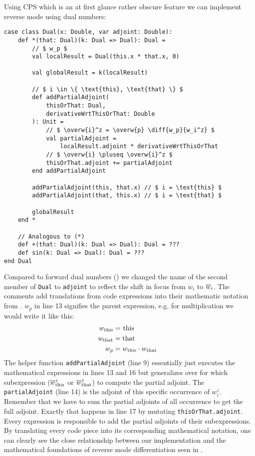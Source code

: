 Using CPS which is an at first glance rather obscure feature we can implement reverse mode using dual numbers:
\begin{lstlisting}[mathescape=true, caption={Reverse mode CPS}, label={lst:cpsDual}]
case class Dual(x: Double, var adjoint: Double):
    def *(that: Dual)(k: Dual => Dual): Dual =
        // $ w_p $
        val localResult = Dual(this.x * that.x, 0)

        val globalResult = k(localResult)
        
        // $ i \in \{ \text{this}, \text{that} \} $
        def addPartialAdjoint(
            thisOrThat: Dual, 
            derivativeWrtThisOrThat: Double
        ): Unit =
            // $ \overw{i}^z = \overw{p} \diff{w_p}{w_i^z} $ 
            val partialAdjoint = 
                localResult.adjoint * derivativeWrtThisOrThat
            // $ \overw{i} \pluseq \overw{i}^z $
            thisOrThat.adjoint += partialAdjoint
        end addPartialAdjoint

        addPartialAdjoint(this, that.x) // $ i = \text{this} $
        addPartialAdjoint(that, this.x) // $ i = \text{that} $

        globalResult
    end *

    // Analogous to (*)
    def +(that: Dual)(k: Dual => Dual): Dual = ???
    def sin(k: Dual => Dual): Dual = ???
end Dual
\end{lstlisting}
Compared to forward dual numbers () we changed the name of the second member of \lstinline{Dual} to \lstinline{adjoint} to reflect the shift in focus from $\dot w_i$ to $\overline{w}_{i}$. The comments add translations from code expressions into their mathematic notation from . $w_p$ in line 13 signifies the parent expression, e.g. for multiplication we would write it like this:
\begin{align*}
    w_{\text{this}} &= \text{\lstinline{this}} \\
    w_{\text{that}} &= \text{\lstinline{that}} \\
    w_p &= w_{\text{this}} \cdot w_{\text{that}}
\end{align*}
The helper function \lstinline{addPartialAdjoint} (line 9) essentially just executes the mathematical expressions in lines 13 and 16 but generalizes over for which subexpression ($\overline{w}_{\text{this}}^z$ or $\overline{w}_{\text{that}}^z$) to compute the partial adjoint. The \lstinline{partialAdjoint} (line 14) is the adjoint of this specific occurrence of $ w_i^z $. Remember that we have to sum the partial adjoints of all occurrence to get the full adjoint. Exactly that happens in line 17 by mutating \lstinline{thisOrThat.adjoint}. Every expression is responsible to add the partial adjoints of their subexpressions. By translating every code piece into its corresponding mathematical notation, one can clearly see the close relationship between our implementation and the mathematical foundations of reverse mode differentiation seen in .

